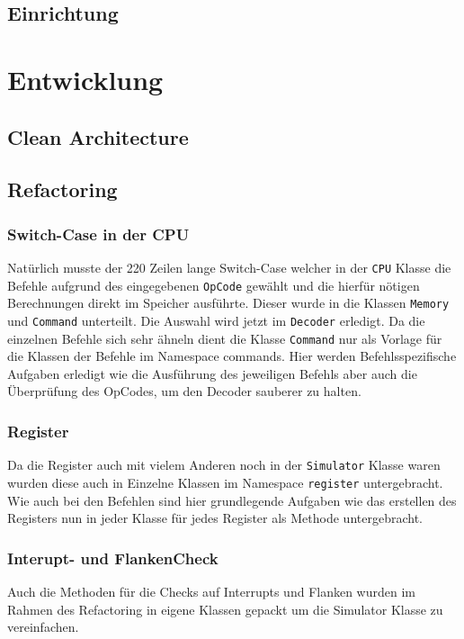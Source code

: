 \documentclass[12pt,a4paper,titlepage,ngerman,pdftex]{report}
\begin{document}
    

    \section{Einrichtung}\label{sec:einrichtung}

    \chapter{Entwicklung}\label{ch:entwicklung}
    \section{Clean Architecture}\label{sec:cleanarchitecture}
 
    \section{Refactoring}\label{sec:refactoring}
    \subsection{Switch-Case in der CPU}
    Natürlich musste der 220 Zeilen lange Switch-Case welcher in der \verb|CPU| Klasse die Befehle aufgrund des eingegebenen \verb|OpCode| 
    gewählt und die hierfür nötigen Berechnungen direkt im Speicher ausführte.
    Dieser wurde in die Klassen \verb|Memory| und \verb|Command| unterteilt. Die Auswahl wird jetzt im \verb|Decoder| erledigt.
    Da die einzelnen Befehle sich sehr ähneln dient die Klasse \verb|Command| nur als Vorlage für die Klassen der Befehle im Namespace commands.
    Hier werden Befehlsspezifische Aufgaben erledigt wie die Ausführung des jeweiligen Befehls aber auch die Überprüfung des OpCodes, um den Decoder sauberer zu halten.
    \subsection{Register}
    Da die Register auch mit vielem Anderen noch in der \verb|Simulator| Klasse  waren wurden diese auch in Einzelne Klassen im Namespace \verb|register| untergebracht. 
    Wie auch bei den Befehlen sind hier grundlegende Aufgaben wie das erstellen des Registers nun in jeder Klasse für jedes Register als Methode untergebracht.
    \subsection{Interupt- und FlankenCheck}
    Auch die Methoden für die Checks auf Interrupts und Flanken wurden im Rahmen des Refactoring in eigene Klassen gepackt um die Simulator Klasse zu vereinfachen.
\end{document}

